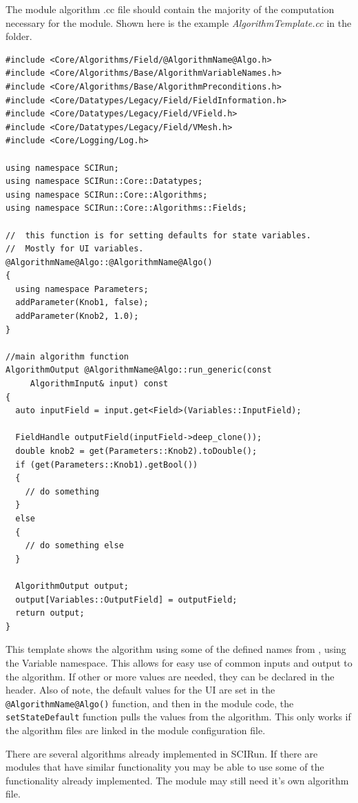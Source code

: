 \documentclass[fleqn,11pt,openany]{book}
\begin{document}
The module algorithm .cc file should contain the majority of the computation necessary for the module.
Shown here is the example \emph{AlgorithmTemplate.cc} in the \emph{} folder.
\begin{verbatim}
#include <Core/Algorithms/Field/@AlgorithmName@Algo.h>
#include <Core/Algorithms/Base/AlgorithmVariableNames.h>
#include <Core/Algorithms/Base/AlgorithmPreconditions.h>
#include <Core/Datatypes/Legacy/Field/FieldInformation.h>
#include <Core/Datatypes/Legacy/Field/VField.h>
#include <Core/Datatypes/Legacy/Field/VMesh.h>
#include <Core/Logging/Log.h>

using namespace SCIRun;
using namespace SCIRun::Core::Datatypes;
using namespace SCIRun::Core::Algorithms;
using namespace SCIRun::Core::Algorithms::Fields;

//  this function is for setting defaults for state variables.  
//  Mostly for UI variables. 
@AlgorithmName@Algo::@AlgorithmName@Algo()
{
  using namespace Parameters;
  addParameter(Knob1, false);
  addParameter(Knob2, 1.0);
}

//main algorithm function
AlgorithmOutput @AlgorithmName@Algo::run_generic(const 
     AlgorithmInput& input) const
{
  auto inputField = input.get<Field>(Variables::InputField);
  
  FieldHandle outputField(inputField->deep_clone());
  double knob2 = get(Parameters::Knob2).toDouble();
  if (get(Parameters::Knob1).getBool())
  {
    // do something
  }
  else
  {
    // do something else
  }

  AlgorithmOutput output;
  output[Variables::OutputField] = outputField;
  return output;
}
\end{verbatim}

This template shows the algorithm using some of the defined names from \emph{}, using the Variable namespace.
This allows for easy use of common inputs and output to the algorithm.  
If other or more values are needed, they can be declared in the header.  
Also of note, the default values for the UI are set in the \verb|@AlgorithmName@Algo()| function, and then in the module code, the \verb|setStateDefault| function pulls the values from the algorithm.  
This only works if the algorithm files are linked in the module configuration file. 

There are several algorithms already implemented in SCIRun.  
If there are modules that have similar functionality you may be able to use some of the functionality already implemented.  
The module may still need it's own algorithm file.  
\end{document}
